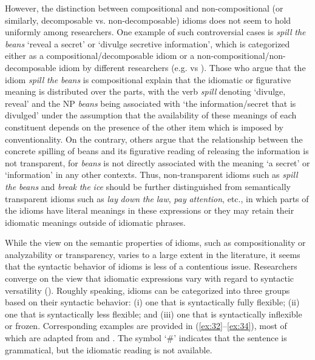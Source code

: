 However, the distinction between compositional and non-compositional (or similarly, decomposable vs. non-decomposable) idioms does not seem to hold uniformly among researchers. One example of such controversial cases is \textit{spill} \textit{the} \textit{beans} ‘reveal a secret’ or ‘divulge secretive information’, which is categorized either as a compositional/decomposable idiom or a non-compositional/non-decomposable idiom by different researchers (e.g. \citealt{CacciariGlucksberg1995,GibbsNayak1989,NunbergEtAl1994} vs \citealt{Abeille1995,Horn2003}). Those who argue that the idiom \textit{spill} \textit{the} \textit{beans} is compositional explain that the idiomatic or figurative meaning is distributed over the parts, with the verb \textit{spill} denoting ‘divulge, reveal’ and the \ac{NP} \textit{beans} being associated with ‘the information/secret that is divulged’ under the assumption that the availability of these meanings of each constituent depends on the presence of the other item which is imposed by conventionality. On the contrary, others argue that the relationship between the concrete spilling of beans and its figurative reading of releasing the information is not transparent, for \textit{beans} is not directly associated with the meaning ‘a secret’ or ‘information’ in any other contexts. Thus, non-transparent idioms such as \textit{spill} \textit{the} \textit{beans} and \textit{break} \textit{the} \textit{ice} should be further distinguished from semantically transparent idioms such as \textit{lay} \textit{down} \textit{the} \textit{law}, \textit{pay} \textit{attention}, etc., in which parts of the idioms have literal meanings in these expressions or they may retain their idiomatic meanings outside of idiomatic phrases. 

  While the view on the semantic properties of idioms, such as compositionality or analyzability or transparency, varies to a large extent in the literature, it seems that the syntactic behavior of idioms is less of a contentious issue. Researchers converge on the view that idiomatic expressions vary with regard to syntactic versatility (\citealt{Nediger2017,TabossiEtAl2009}). Roughly speaking, idioms can be categorized into three groups based on their syntactic behavior: (i) one that is syntactically fully flexible; (ii) one that is syntactically less flexible; and (iii) one that is syntactically inflexible or frozen. Corresponding examples are provided in (\ref{ex:32}--\ref{ex:34}), most of which are adapted from \citet{Horn2003} and \citet{Schenk1995}. The symbol `\#' indicates that the sentence is grammatical, but the idiomatic reading is not available.

